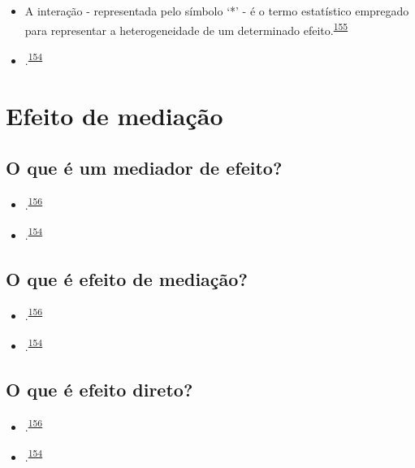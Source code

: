 \documentclass[
  a4paper,
]{book}
\begin{document}
\begin{itemize}
\item
  A interação - representada pelo símbolo `*' - é o termo estatístico empregado para representar a heterogeneidade de um determinado efeito.\textsuperscript{\protect\hyperlink{ref-Altman1996}{155}}
\item
  .\textsuperscript{\protect\hyperlink{ref-Bours2023}{154}}
\end{itemize}

\hypertarget{mediacao}{%
\section{Efeito de mediação}\label{mediacao}}

\hypertarget{o-que-uxe9-um-mediador-de-efeito}{%
\subsection{O que é um mediador de efeito?}\label{o-que-uxe9-um-mediador-de-efeito}}

\begin{itemize}
\item
  .\textsuperscript{\protect\hyperlink{ref-Baron1986}{156}}
\item
  .\textsuperscript{\protect\hyperlink{ref-Bours2023}{154}}
\end{itemize}

\hypertarget{o-que-uxe9-efeito-de-mediauxe7uxe3o}{%
\subsection{O que é efeito de mediação?}\label{o-que-uxe9-efeito-de-mediauxe7uxe3o}}

\begin{itemize}
\item
  .\textsuperscript{\protect\hyperlink{ref-Baron1986}{156}}
\item
  .\textsuperscript{\protect\hyperlink{ref-Bours2023}{154}}
\end{itemize}

\hypertarget{o-que-uxe9-efeito-direto}{%
\subsection{O que é efeito direto?}\label{o-que-uxe9-efeito-direto}}

\begin{itemize}
\item
  .\textsuperscript{\protect\hyperlink{ref-Baron1986}{156}}
\item
  .\textsuperscript{\protect\hyperlink{ref-Bours2023}{154}}
\end{itemize}
\end{document}
